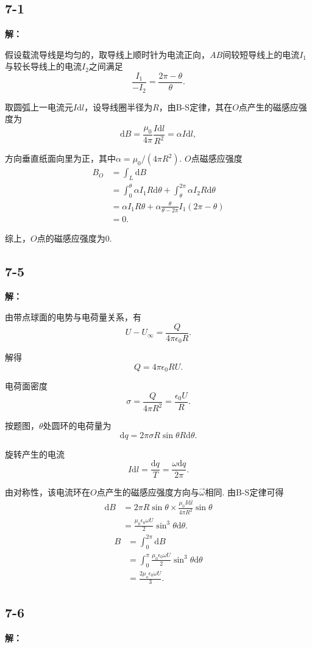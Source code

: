 \documentclass[twocolumn]{ctexart}
\newcommand{\sol}[1]{\subsection*{#1}\noindent\textbf{解：}
	
}
\begin{document}
	\sol{7-1}
	
	假设载流导线是均匀的，取导线上顺时针为电流正向，$AB$间较短导线上的电流$I_1$与较长导线上的电流$I_2$之间满足
	$$\frac{I_1}{-I_2}=\frac{2\pi-\theta}{\theta}.$$
	
	取圆弧上一电流元$I\mathrm dl$，设导线圈半径为$R$，由B-S定律，其在$O$点产生的磁感应强度为
	$$\mathrm dB=\frac{\mu_0}{4\pi}\frac{I\mathrm dl}{R^2}=\alpha I\mathrm dl,$$
	
	方向垂直纸面向里为正，其中$\alpha=\mu_0/\left(4\pi R^2\right)$. $O$点磁感应强度
	\begin{align*}
		B_O&=\int_{L}\mathrm dB\\
		&=\int_{0}^{\theta}\alpha I_1R\mathrm d\theta+\int_{\theta}^{2\pi}\alpha I_2R\mathrm d\theta\\
		&=\alpha I_1R\theta+\alpha\frac{\theta}{\theta-2\pi}I_1\left(2\pi-\theta\right)\\
		&=0.
	\end{align*}

	综上，$O$点的磁感应强度为$0$.
	\sol{7-5}
	由带点球面的电势与电荷量关系，有
	$$U-U_{\infty}=\frac{Q}{4\pi\epsilon_0R}.$$
	
	解得
	$$Q=4\pi\epsilon_0 RU.$$
	
	电荷面密度
	$$\sigma=\frac{Q}{4\pi R^2}=\frac{\epsilon_0 U}{R}.$$
	
	按题图，$\theta$处圆环的电荷量为$$\mathrm dq=2\pi\sigma R\sin\theta R\mathrm d\theta.$$
	
	旋转产生的电流
	$$I\mathrm dl=\frac{\mathrm dq}{T}=\frac{\omega\mathrm dq}{2\pi}.$$
	
	由对称性，该电流环在$O$点产生的磁感应强度方向与$\vec\omega$相同. 由B-S定律可得
	\begin{align*}
		\mathrm dB&=2\pi R\sin\theta\times \frac{\mu_0I\mathrm dl}{4\pi R^2}\sin\theta\\
		&=\frac{\mu_0\epsilon_0\omega U}{2}\sin^3\theta\mathrm d\theta.
	\end{align*}
	\begin{align*}
		B&=\int_{0}^{2\pi}\mathrm dB\\
		&=\int_{0}^{\pi}\frac{\mu_0\epsilon_0\omega U}{2}\sin^3\theta\mathrm d\theta\\
		&=\frac{2\mu_o\epsilon_0\omega U}{3}.
	\end{align*}	
	\sol{7-6}
	
\end{document}
